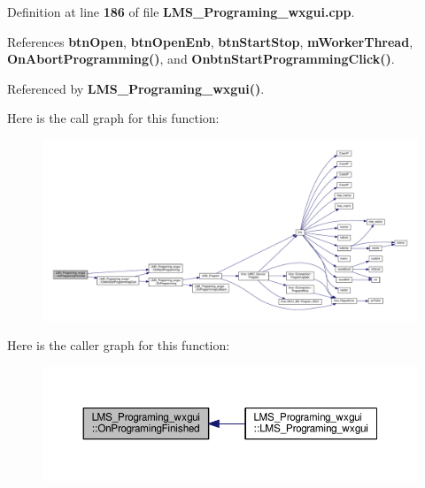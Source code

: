 Definition at line {\bf 186} of file {\bf L\+M\+S\+\_\+\+Programing\+\_\+wxgui.\+cpp}.



References {\bf btn\+Open}, {\bf btn\+Open\+Enb}, {\bf btn\+Start\+Stop}, {\bf m\+Worker\+Thread}, {\bf On\+Abort\+Programming()}, and {\bf Onbtn\+Start\+Programming\+Click()}.



Referenced by {\bf L\+M\+S\+\_\+\+Programing\+\_\+wxgui()}.



Here is the call graph for this function\+:
\nopagebreak
\begin{figure}[H]
\begin{center}
\leavevmode
\includegraphics[width=350pt]{db/d33/classLMS__Programing__wxgui_ad8cce5235c464cca222634b82be854ec_cgraph}
\end{center}
\end{figure}




Here is the caller graph for this function\+:
\nopagebreak
\begin{figure}[H]
\begin{center}
\leavevmode
\includegraphics[width=350pt]{db/d33/classLMS__Programing__wxgui_ad8cce5235c464cca222634b82be854ec_icgraph}
\end{center}
\end{figure}


